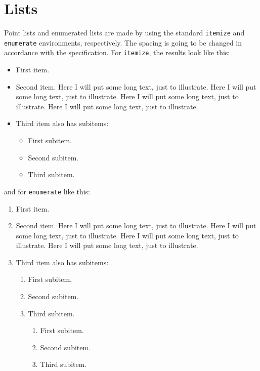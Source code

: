\section{Lists}
\label{sec:lists}

Point lists and enumerated lists are made by using the standard
\texttt{itemize} and \texttt{enumerate} environments, respectively.
The spacing is going to be changed in accordance with the specification. For
\texttt{itemize}, the results look like this:
\begin{itemize}
	\item First item.
	\item Second item. Here I will put some long text, just to illustrate.
	  Here I will put some long text, just to illustrate. Here I will put
	  some long text, just to illustrate. Here I will put some long text,
	  just to illustrate.
	\item Third item also has subitems:
	  \begin{itemize}
		  \item First subitem.
		  \item Second subitem.
		  \item Third subitem.
			  \end{itemize}
\end{itemize}
and for \texttt{enumerate} like this:
\begin{enumerate}
	\item First item.
	\item Second item. Here I will put some long text, just to illustrate.
	  Here I will put some long text, just to illustrate. Here I will put
	  some long text, just to illustrate. Here I will put some long text,
	  just to illustrate.
	\item Third item also has subitems:
	  \begin{enumerate}
		  \item First subitem.
		  \item Second subitem.
		  \item Third subitem.	  
			\begin{enumerate}
		  \item First subitem.
		  \item Second subitem.
		  \item Third subitem.
	  \end{enumerate}
	  \end{enumerate}
\end{enumerate}

